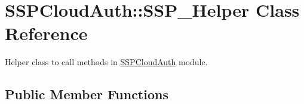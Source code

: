 \hypertarget{classSSPCloudAuth_1_1SSP__Helper}{
\section{\-S\-S\-P\-C\-l\-o\-u\-d\-A\-u\-t\-h\-:\-:\-S\-S\-P\_\-\-H\-e\-l\-p\-e\-r \-C\-l\-a\-s\-s \-R\-e\-f\-e\-r\-e\-n\-c\-e}
\label{classSSPCloudAuth_1_1SSP__Helper}
}


Helper class to call methods in \hyperlink{namespaceSSPCloudAuth}{\-S\-S\-P\-C\-l\-o\-u\-d\-A\-u\-t\-h} module.  


\subsection*{Public Member Functions}

